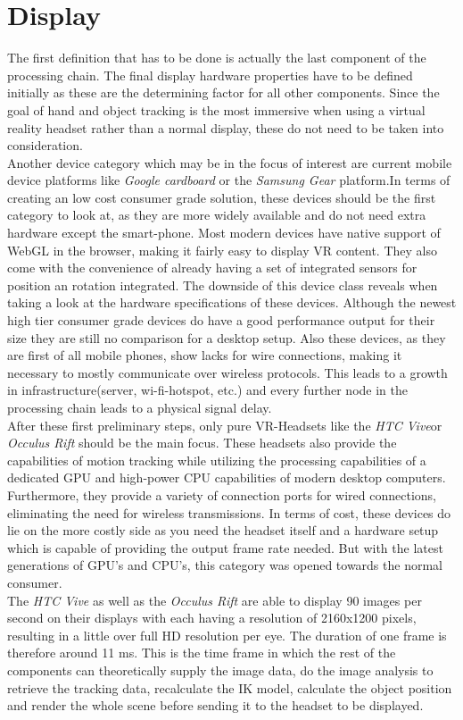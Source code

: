  \section{Display}
 The first definition that has to be done is actually the last component of the processing chain. The final display hardware properties have to be defined initially as these are the determining factor for all other components. Since the goal of hand and object tracking is the most immersive when using a virtual reality headset rather than a normal display, these do not need to be taken into consideration.\\
Another device category which may be in the focus of interest are current mobile device platforms like \textit{Google cardboard} or the \textit{Samsung Gear} platform.In terms of creating an low cost consumer grade solution, these devices should be the first category to look at, as they are more widely available and do not need extra hardware except the smart-phone. Most modern devices have native support of WebGL in the browser, making it fairly easy to display VR content. They also come with the convenience of already having a set of integrated sensors for position an rotation integrated. The downside of this device class reveals when taking a look at the hardware specifications of these devices. Although the newest high tier consumer grade devices do have a good performance output for their size they are still no comparison for a desktop setup. Also these devices, as they are first of all mobile phones, show lacks for wire connections, making it necessary to mostly communicate over wireless protocols. This leads to a growth in infrastructure(server, wi-fi-hotspot, etc.) and every further node in the processing chain leads to a physical signal delay.\\
After these first preliminary steps, only pure VR-Headsets like the \textit{HTC Vive}\cite{HTC.2018}or \textit{Occulus Rift} \cite{OculusVR.2018}should be the main focus. These headsets also provide the capabilities of motion tracking while utilizing the processing capabilities of a dedicated GPU and high-power CPU capabilities of modern desktop computers. Furthermore, they provide a variety of connection ports for wired connections, eliminating the need for wireless transmissions. In terms of cost, these devices do lie on the more costly side as you need the headset itself and a hardware setup which is capable of providing the output frame rate needed. But with the latest generations of GPU's and CPU's, this category was opened towards the normal consumer.\\
The \textit{HTC Vive} as well as the \textit{Occulus Rift} are able to display 90 images per second on their displays with each having a resolution of 2160x1200 pixels, resulting in a little over full HD resolution per eye. The duration of one frame is therefore around 11 ms. This is the time frame in which the rest of the components can theoretically supply the image data, do the image analysis to retrieve the tracking data, recalculate the IK model, calculate the object position and render the whole scene before sending it to the headset to be displayed.
